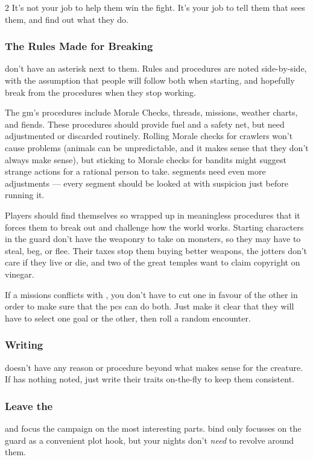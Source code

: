 \begin{multicols}{2}
It's not your job to help them win the fight.
It's your job to tell them that  sees them, and find out what they do.

\subsubsection{The Rules Made for Breaking}
don't have an asterisk next to them.
Rules and procedures are noted side-by-side, with the assumption that people will follow both when starting, and hopefully break from the procedures when they stop working.

The \gls{gm}'s procedures include Morale Checks, \glspl{thread}, missions, weather charts, and \glspl{fiend}.
These procedures should provide fuel and a safety net, but need adjustmented or discarded routinely.
Rolling Morale checks for \glspl{crawler} won't cause problems (animals can be unpredictable, and it makes sense that they don't always make sense), but sticking to Morale checks for bandits might suggest strange actions for a rational person to take.
\Glspl{segment} need even more adjustments --- every \gls{segment} should be looked at with suspicion just before running it.

Players should find themselves so wrapped up in meaningless procedures that it forces them to break out and challenge how the world works.
Starting characters in the \gls{guard} don't have the weaponry to take on monsters, so they may have to steal, beg, or flee.
Their taxes stop them buying better weapons, the \glspl{jotter} don't care if they live or die, and two of the great \glspl{temple} want to claim copyright on vinegar.

If a missions conflicts with , you don't have to cut one in favour of the other in order to make sure that the \glspl{pc} can do both.
Just make it clear that they will have to select one goal or the other, then roll a random encounter.

\subsubsection{Writing }
doesn't have any reason or procedure beyond what makes sense for the creature.
If  has nothing noted, just write their \glspl{trait} on-the-fly to keep them consistent.

\subsubsection{Leave the }
and focus the \gls{campaign} on the most interesting parts.
\Gls{bind} only focusses on the \gls{guard} as a convenient plot hook, but your nights don't \emph{need} to revolve around them.


\end{multicols}
